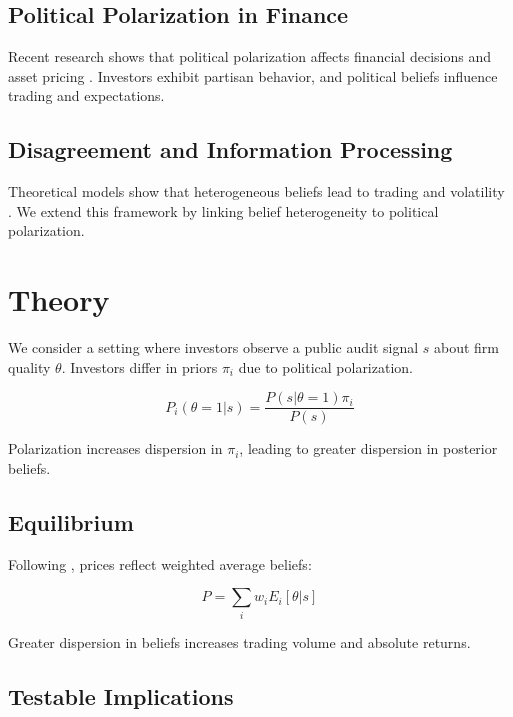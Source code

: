 \documentclass[12pt]{article}
\begin{document}
\subsection{Political Polarization in Finance}

Recent research shows that political polarization affects financial decisions and asset pricing \citep{kempf2024}. Investors exhibit partisan behavior, and political beliefs influence trading and expectations.

\subsection{Disagreement and Information Processing}

Theoretical models show that heterogeneous beliefs lead to trading and volatility \citep{kandel1995,harris1993,hong2007}. We extend this framework by linking belief heterogeneity to political polarization.

\section{Theory}

We consider a setting where investors observe a public audit signal $s$ about firm quality $\theta$. Investors differ in priors $\pi_i$ due to political polarization.

\begin{equation}
P_i(\theta=1|s) = \frac{P(s|\theta=1)\pi_i}{P(s)}
\end{equation}

Polarization increases dispersion in $\pi_i$, leading to greater dispersion in posterior beliefs.

\subsection{Equilibrium}

Following \citet{harris1993}, prices reflect weighted average beliefs:

\begin{equation}
P = \sum_i w_i E_i[\theta|s]
\end{equation}

Greater dispersion in beliefs increases trading volume and absolute returns.

\subsection{Testable Implications}
\end{document}
